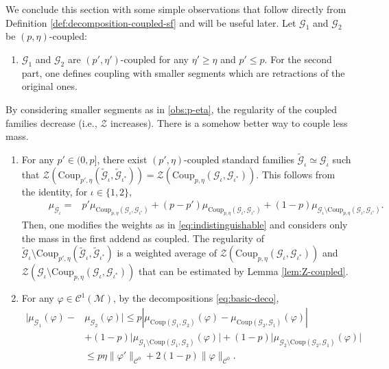 \documentclass{amsart}
\numberwithin{equation}{section}
\newcommand\vf{\varphi}
\renewcommand{\ge}{\geqslant}
\renewcommand{\le}{\leqslant}
\newcommand\cC{{\mathcal C}}
\newcommand\cG{{\mathcal G}}
\newcommand\cM{{\mathcal M}}
\newcommand\cZ{{\mathcal Z}}
\newcommand{\Coup}{\text{Coup}}
\begin{document}
We conclude this section with some simple observations that follow directly from Definition \ref{def:decomposition-coupled-sf} and will be useful later. Let \(\cG_1\) and \(\cG_2\) be \((p,\eta)\)-coupled:
 \begin{enumerate}
  \item [{\crtcrossreflabel{(O1)}[obs:p-eta]}] \(\cG_1\) and \(\cG_2\) are \((p',\eta')\)-coupled for any \(\eta' \ge \eta\) and \(p' \le p\). For the second part, one defines coupling with smaller segments which are retractions of the original ones.
\end{enumerate}
By considering smaller segments as in \ref{obs:p-eta}, the regularity of the coupled families decrease (i.e., \(\cZ\) increases). There is a somehow better way to couple less mass.
\begin{enumerate}
  \item  [{\crtcrossreflabel{(O2)}[obs:pless]}]
For any \(p' \in (0,p]\), there exist \((p',\eta)\)-coupled standard families \(\widetilde \cG_\iota \simeq \cG_\iota\) such that \(\cZ (\Coup_{p', \eta}(\widetilde \cG_\iota, \widetilde \cG_{\iota^*})) = \cZ (\Coup_{p, \eta}(\cG_\iota, \cG_{\iota^{*}}))\). This follows from the identity, for \(\iota \in \{1,2\}\),
\[
\begin{split}
\hspace{1cm}\mu_{\cG_{\iota}} \!= & p'\!\mu_{\Coup_{p,\eta}(\cG_\iota, \cG_{\iota^*})} \! +\! (p\!-\!p')\mu_{\Coup_{p,\eta}(\cG_\iota, \cG_{\iota^*})} \!+\!(1\!-\!p)\mu_{ \cG_{\iota} \setminus \Coup_{p,\eta}(\cG_{\iota}, \cG_{\iota^*})}.
\end{split}
\]
Then, one modifies the weights as in \eqref{eq:indistinguishable} and considers only the mass in the first addend as coupled. The regularity of \(\widetilde \cG_{\iota} \setminus \Coup_{p',\eta}(\widetilde \cG_{\iota}, \widetilde \cG_{\iota^*})\) is a weighted average of \(\cZ (\Coup_{p, \eta}(\cG_\iota, \cG_{\iota^*}))\) and \(\cZ(\cG_{\iota} \setminus \Coup_{p,\eta}(\cG_{\iota}, \cG_{\iota^*}))\) that can be estimated by Lemma \ref{lem:Z-coupled}.
  \item  [{\crtcrossreflabel{(O3)}[item:dist]}] For any \(\vf \in \cC^1(\cM)\), by the decompositions \eqref{eq:basic-deco}, 
  \[
\begin{split}
    \bigl|\mu_{\cG_1}(\vf) - &\mu_{\cG_2}(\vf)\bigr| \le p\left|\mu_{\Coup(\cG_1, \cG_2)}(\vf) \!- \!\mu_{\Coup(\cG_2, \cG_1)}(\vf)\right| \\
&+ (1-p)\bigl|\mu_{\cG_1 \setminus \Coup(\cG_1, \cG_2)}(\vf)\bigr| + (1-p)\bigl|\mu_{\cG_2 \setminus \Coup(\cG_2, \cG_1)}(\vf)\bigr| \\
&\le p\eta \|\vf'\|_{\cC^0} + 2(1-p)\|\vf\|_{\cC^0}. 
\end{split}
\]
 \end{enumerate}
\end{document}
